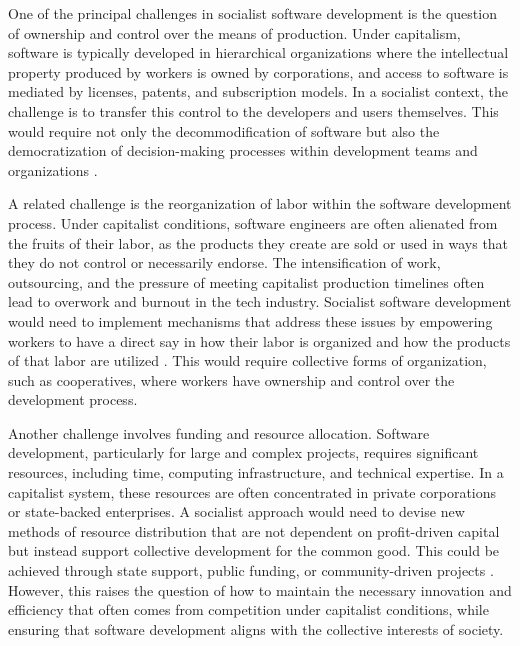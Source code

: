 \begin{refsection}
One of the principal challenges in socialist software development is the question of ownership and control over the means of production. Under capitalism, software is typically developed in hierarchical organizations where the intellectual property produced by workers is owned by corporations, and access to software is mediated by licenses, patents, and subscription models. In a socialist context, the challenge is to transfer this control to the developers and users themselves. This would require not only the decommodification of software but also the democratization of decision-making processes within development teams and organizations \cite[pp.~215]{kling}. 

A related challenge is the reorganization of labor within the software development process. Under capitalist conditions, software engineers are often alienated from the fruits of their labor, as the products they create are sold or used in ways that they do not control or necessarily endorse. The intensification of work, outsourcing, and the pressure of meeting capitalist production timelines often lead to overwork and burnout in the tech industry. Socialist software development would need to implement mechanisms that address these issues by empowering workers to have a direct say in how their labor is organized and how the products of that labor are utilized \cite[pp.~101-102]{scholz}. This would require collective forms of organization, such as cooperatives, where workers have ownership and control over the development process.

Another challenge involves funding and resource allocation. Software development, particularly for large and complex projects, requires significant resources, including time, computing infrastructure, and technical expertise. In a capitalist system, these resources are often concentrated in private corporations or state-backed enterprises. A socialist approach would need to devise new methods of resource distribution that are not dependent on profit-driven capital but instead support collective development for the common good. This could be achieved through state support, public funding, or community-driven projects \cite[pp.~78-79]{benkler}. However, this raises the question of how to maintain the necessary innovation and efficiency that often comes from competition under capitalist conditions, while ensuring that software development aligns with the collective interests of society.


\end{refsection}
